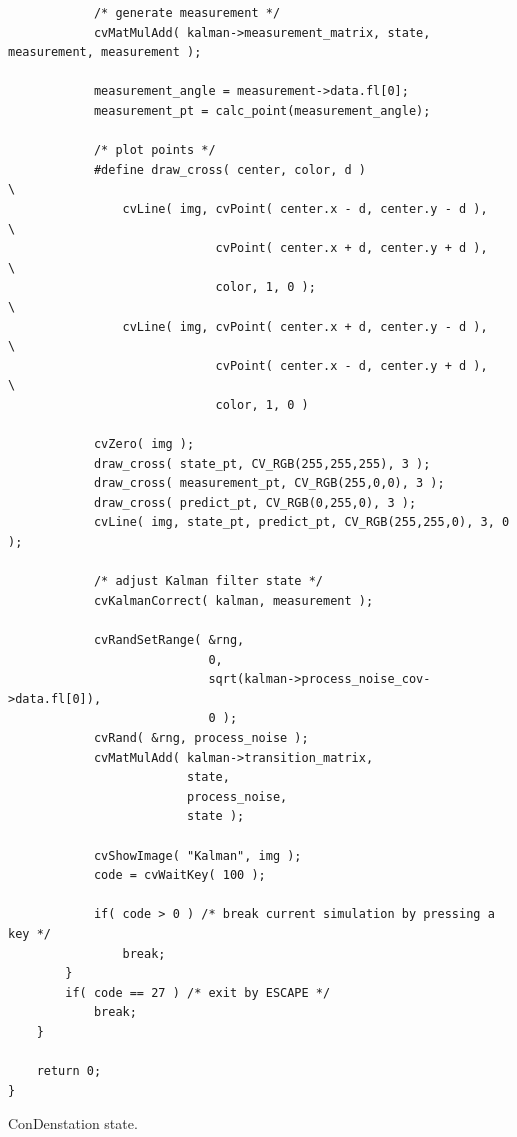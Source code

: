 \begin{lstlisting}
            /* generate measurement */
            cvMatMulAdd( kalman->measurement_matrix, state, measurement, measurement );

            measurement_angle = measurement->data.fl[0];
            measurement_pt = calc_point(measurement_angle);

            /* plot points */
            #define draw_cross( center, color, d )                        \
                cvLine( img, cvPoint( center.x - d, center.y - d ),       \
                             cvPoint( center.x + d, center.y + d ),       \
                             color, 1, 0 );                               \
                cvLine( img, cvPoint( center.x + d, center.y - d ),       \
                             cvPoint( center.x - d, center.y + d ),       \
                             color, 1, 0 )

            cvZero( img );
            draw_cross( state_pt, CV_RGB(255,255,255), 3 );
            draw_cross( measurement_pt, CV_RGB(255,0,0), 3 );
            draw_cross( predict_pt, CV_RGB(0,255,0), 3 );
            cvLine( img, state_pt, predict_pt, CV_RGB(255,255,0), 3, 0 );

            /* adjust Kalman filter state */
            cvKalmanCorrect( kalman, measurement );

            cvRandSetRange( &rng,
                            0,
                            sqrt(kalman->process_noise_cov->data.fl[0]),
                            0 );
            cvRand( &rng, process_noise );
            cvMatMulAdd( kalman->transition_matrix,
                         state,
                         process_noise,
                         state );

            cvShowImage( "Kalman", img );
            code = cvWaitKey( 100 );

            if( code > 0 ) /* break current simulation by pressing a key */
                break;
        }
        if( code == 27 ) /* exit by ESCAPE */
            break;
    }

    return 0;
}
\end{lstlisting}

\label{CvConDensation}

ConDenstation state.


